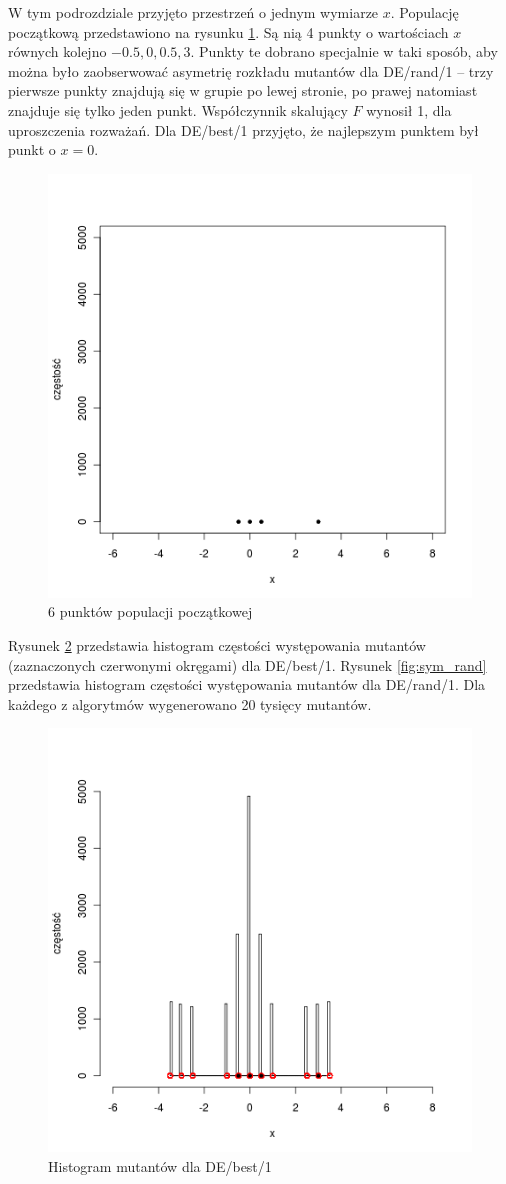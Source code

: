 \documentclass[a4paper,onecolumn,oneside,12pt,wide,floatssmall]{mwrep}
\theoremstyle{definition}
\theoremstyle{plain}%
\theoremstyle{remark}
\begin{document}
W tym podrozdziale przyjęto przestrzeń o jednym wymiarze $x$.
Populację początkową przedstawiono na rysunku \ref{fig:sym_none}.
Są nią 4 punkty o wartościach $x$ równych kolejno $-0.5, 0, 0.5, 3$.
Punkty te dobrano specjalnie w taki sposób, aby można było zaobserwować asymetrię
rozkładu mutantów dla DE/rand/1 -- trzy pierwsze punkty znajdują się w grupie po lewej stronie, 
po prawej natomiast znajduje się tylko jeden punkt.
Współczynnik skalujący $F$ wynosił 1, dla uproszczenia rozważań.
Dla DE/best/1 przyjęto, że najlepszym punktem był punkt o $x = 0$.

\begin{figure}[H]
\centering
\includegraphics[width=.65\textwidth]{img/none}
\caption{6 punktów populacji początkowej} 
\label{fig:sym_none}
\end{figure}
Rysunek \ref{fig:sym_best} przedstawia histogram częstości występowania
mutantów (zaznaczonych czerwonymi okręgami) dla DE/best/1. 
Rysunek \ref{fig:sym_rand} przedstawia histogram częstości występowania
mutantów dla DE/rand/1. Dla każdego z algorytmów wygenerowano 20 tysięcy mutantów.

\begin{figure}[H]
\centering
\includegraphics[width=.65\textwidth]{img/best}
\caption{Histogram mutantów dla DE/best/1} 
\label{fig:sym_best}
\end{figure}
\end{document}
